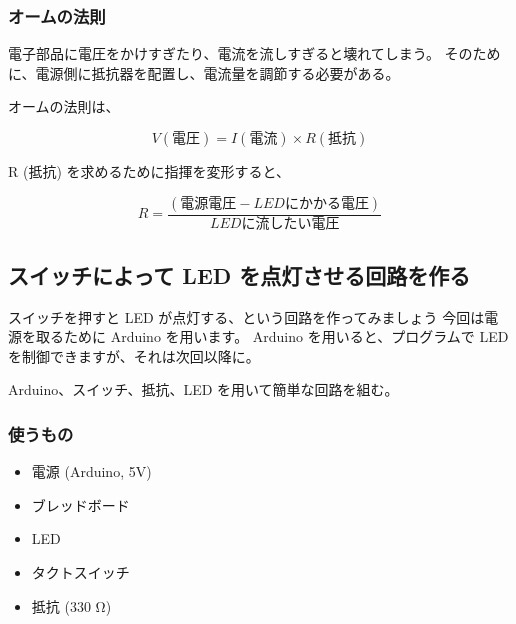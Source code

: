 \documentclass[11pt,a4paper]{jarticle}
\begin{document}
\subsubsection*{オームの法則}
電子部品に電圧をかけすぎたり、電流を流しすぎると壊れてしまう。
そのために、電源側に抵抗器を配置し、電流量を調節する必要がある。

オームの法則は、


\begin{equation}
 V (電圧) = I (電流) \times R (抵抗)
\end{equation}

R (抵抗) を求めるために指揮を変形すると、

\begin{equation}
 R = \frac{(電源電圧 - LEDにかかる電圧)}{LEDに流したい電圧}
\end{equation}


\subsection*{スイッチによって LED を点灯させる回路を作る}
スイッチを押すと LED が点灯する、という回路を作ってみましょう
今回は電源を取るために Arduino を用います。
Arduino を用いると、プログラムで LED を制御できますが、それは次回以降に。

Arduino、スイッチ、抵抗、LED を用いて簡単な回路を組む。


\subsubsection*{使うもの}
\begin{itemize}
 \item 電源 (Arduino, 5V)
 \item ブレッドボード
 \item LED
 \item タクトスイッチ
 \item 抵抗 (330 Ω)
\end{itemize}


\end{document}
